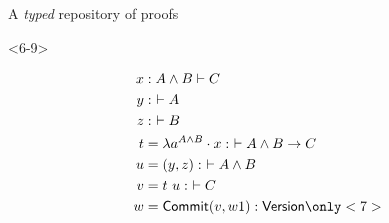 \documentclass[ignorenonframetext,red]{beamer}
\newcommand\postbinder{\cdot}
\newcommand\app[1]{{#1}\ }
\newcommand\tlam[2]{\ensuremath\lambda{#1}^{#2}\postbinder}
\newcommand\lam{\tlam}
\begin{document}
\begin{frame}[fragile]{A \emph{typed} repository of proofs}
\begin{onlyenv}
\begin{center}
    \end{center}
  \end{onlyenv}
  \begin{onlyenv}<6-9>
    \small
    \begin{overlayarea}{0pt}{\textheight}
      \begin{align*}
        x &: A\wedge B\vdash C \\
        y &:\ \vdash A \\
        z &:\ \vdash B \\
        t &= \lam a {A\wedge B} x :\ \vdash A\wedge B\to C \\
        u &= (y, z) :\ \vdash A\wedge B \\
        v &= \app t u :\ \vdash C \\
        w &= \mathsf{Commit}(v,w1) : \mathsf{Version} \only<7>{
}
\end{align*}
\end{overlayarea}
\end{onlyenv}
\end{frame}
\end{document}
